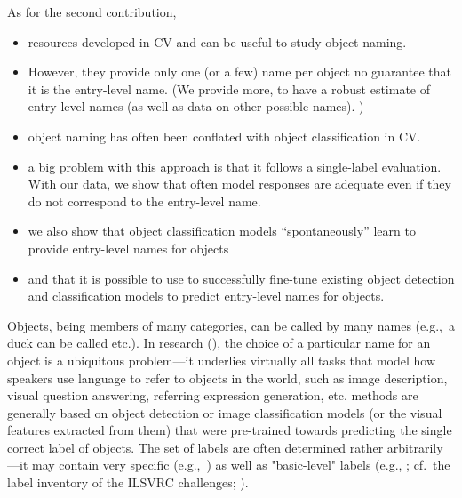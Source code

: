 As for the second contribution, 
\begin{itemize}
\item resources developed in CV and \lv can be useful to study object naming. 
\item However, they provide only one (or a few) name per object \ra no guarantee that it is the entry-level name. (We provide more, to have a robust estimate of entry-level names (as well as data on other possible names). )
\item object naming has often been conflated with object classification in CV. 
\item a big problem with this approach is that it follows a single-label evaluation. With our data, we show that often model responses are adequate even if they do not correspond to the entry-level name.
\item we also show that object classification models ``spontaneously'' learn to provide entry-level names for objects
\item and that it is possible to use \mn to successfully fine-tune existing object detection and classification models to predict entry-level names for objects.
\end{itemize}


Objects, being members of many categories, can be called by many names (e.g.,\ a duck can be called  etc.). 
In \langvis research (\lv), the choice of a particular name for an object is a ubiquitous problem---it underlies virtually all tasks that model how speakers use language to refer to objects in the world, such as image description, visual question answering, referring expression generation, etc. 
%
\lv methods are generally based on object detection or image classification models (or the visual features extracted from them) that were pre-trained towards predicting the single correct label of objects. 
The set of labels are often determined rather arbitrarily---it may contain very specific (e.g.,\ ) as well as "basic-level" labels (e.g., ; cf.\ the label inventory of the ILSVRC challenges; \citealt{ILSVRC15}). 

